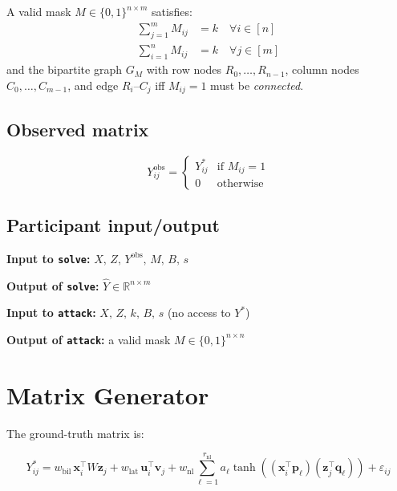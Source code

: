 \documentclass[11pt,a4paper]{article}
\begin{document}
A valid mask $M \in \{0,1\}^{n \times m}$ satisfies:
\begin{align}
  \sum_{j=1}^{m} M_{ij} &= k \quad \forall i \in [n] \label{eq:row-sum}\\
  \sum_{i=1}^{n} M_{ij} &= k \quad \forall j \in [m] \label{eq:col-sum}
\end{align}
and the bipartite graph $G_M$ with row nodes $R_0,\ldots,R_{n-1}$, column nodes
$C_0,\ldots,C_{m-1}$, and edge $R_i$--$C_j$ iff $M_{ij}=1$ must be \emph{connected}.

\subsection{Observed matrix}

\begin{equation}
  Y^{\text{obs}}_{ij} = \begin{cases} Y^*_{ij} & \text{if } M_{ij} = 1 \\ 0 & \text{otherwise} \end{cases}
\end{equation}

\subsection{Participant input/output}

\textbf{Input to \texttt{solve}:} $X,\, Z,\, Y^{\text{obs}},\, M,\, B,\, s$

\textbf{Output of \texttt{solve}:} $\hat{Y} \in \mathbb{R}^{n \times m}$

\textbf{Input to \texttt{attack}:} $X,\, Z,\, k,\, B,\, s$ \quad (no access to $Y^*$)

\textbf{Output of \texttt{attack}:} a valid mask $M \in \{0,1\}^{n \times n}$

\section{Matrix Generator}

The ground-truth matrix is:

\begin{equation}
  Y^*_{ij} = w_{\text{bil}}\, \mathbf{x}_i^\top W \mathbf{z}_j
           + w_{\text{lat}}\, \mathbf{u}_i^\top \mathbf{v}_j
           + w_{\text{nl}} \sum_{\ell=1}^{r_{\text{nl}}} a_\ell \tanh\!\left((\mathbf{x}_i^\top \mathbf{p}_\ell)(\mathbf{z}_j^\top \mathbf{q}_\ell)\right)
           + \varepsilon_{ij}
  \label{eq:generator}
\end{equation}
\end{document}
